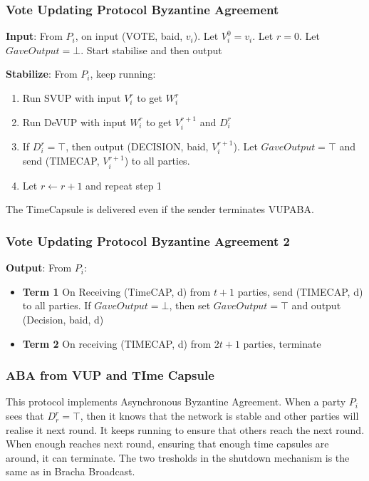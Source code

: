 \documentclass[14pt]{beamer}
\begin{document}
            \begin{frame}
                \frametitle{Vote Updating Protocol Byzantine Agreement}
                    \textbf{Input}: From $P_i$, on input (VOTE, baid, $v_i$). Let $V_{i}^0 = v_i$. Let $r = 0$. Let $GaveOutput = \bot$. Start stabilise and then output

                    \textbf{Stabilize}: From $P_i$, keep running:
                    \begin{enumerate}
                        \item Run SVUP with input $V_{i}^r$ to get $W_{i}^r$
                        \item Run DeVUP with input $W_{i}^r$ to get $V_{i}^{r+1}$ and $D_{i}^r$
                        \item If $D_{i}^r = \top$, then output (DECISION, baid, $V_{i}^{r+1}$). Let $GaveOutput = \top$ and send (TIMECAP, $V_{i}^{r+1}$) to all parties. 
                        \item Let $r \leftarrow r + 1$ and repeat step 1
                    \end{enumerate}
                    The TimeCapsule is delivered even if the sender terminates VUPABA. 
            \end{frame}
            \begin{frame}   
                \frametitle{Vote Updating Protocol Byzantine Agreement 2}
                    \textbf{Output}: From $P_i$:
                        \begin{itemize}
                            \item \textbf{Term 1} On Receiving (TimeCAP, d) from $t+1$ parties, send (TIMECAP, d) to all parties. If $GaveOutput = \bot$, then set $GaveOutput = \top$ and output (Decision, baid, d)
                            \item \textbf{Term 2} On receiving (TIMECAP, d) from $2t + 1$ parties, terminate
                        \end{itemize}
            \end{frame}

            \begin{frame}
                \frametitle{ABA from VUP and TIme Capsule}
                    This protocol implements Asynchronous Byzantine Agreement. When a party $P_i$ sees that $D_{r}^r = \top$, then it knows that the network is stable and other parties will realise it next round. It keeps running to ensure that others reach the next round. When enough reaches next round, ensuring that enough time capsules are around, it can terminate. The two tresholds in the shutdown mechanism is the same as in Bracha Broadcast. 
            \end{frame}
\end{document}
